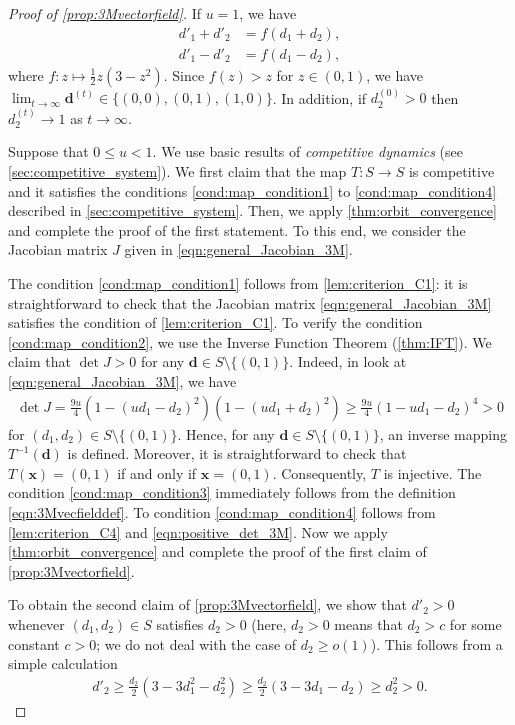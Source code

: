 \documentclass[letterpaper,11pt]{article}
\begin{document}
\begin{proof}[Proof of \cref{prop:3Mvectorfield}]
If $u=1$, we have
\begin{align*}
d'_1+d'_2 &= f(d_1+d_2), \\
d'_1-d'_2 &= f(d_1-d_2),
\end{align*}
where $f:z\mapsto \frac{1}{2}z(3-z^2)$.
Since $f(z)>z$ for $z\in(0,1)$, we have $\lim_{t\to\infty}\mathbf{d}^{(t)}\in\{(0,0),(0,1),(1,0)\}$.
In addition, if $d_2^{(0)}>0$ then $d_2^{(t)}\to 1$ as $t\to\infty$.

Suppose that $0\leq u<1$.
We use basic results of \emph{competitive dynamics} (see \cref{sec:competitive_system}).
We first claim that the map $T:S\to S$ is competitive and it satisfies the conditions \ref{cond:map_condition1} to \ref{cond:map_condition4} described in \cref{sec:competitive_system}.
Then, we apply \cref{thm:orbit_convergence} and complete the proof of the first statement.
To this end, we consider the Jacobian matrix $J$ given in \cref{eqn:general_Jacobian_3M}.

The condition \ref{cond:map_condition1} follows from \cref{lem:criterion_C1}: it is straightforward to check that the Jacobian matrix \cref{eqn:general_Jacobian_3M} satisfies the condition of \cref{lem:criterion_C1}.
To verify the condition \ref{cond:map_condition2}, we use the Inverse Function Theorem (\cref{thm:IFT}).
We claim that $\det J>0$ for any $\mathbf{d}\in S\setminus\{(0,1)\}$.
Indeed, in look at \cref{eqn:general_Jacobian_3M}, we have
\begin{align}
\det J = \frac{9u}{4}(1-(ud_1-d_2)^2)(1-(ud_1+d_2)^2) 
\geq \frac{9u}{4}(1-ud_1-d_2)^4 
>0 \label{eqn:positive_det_3M}
\end{align}
for $(d_1,d_2)\in S\setminus \{(0,1)\}$.
Hence, for any $\mathbf{d}\in S\setminus \{(0,1)\}$, an inverse mapping $T^{-1}(\mathbf{d})$ is defined.
Moreover, it is straightforward to check that $T(\mathbf{x})=(0,1)$ if and only if $\mathbf{x}=(0,1)$.
Consequently, $T$ is injective.
The condition \ref{cond:map_condition3} immediately follows from the definition \cref{eqn:3Mvecfielddef}.
To condition \ref{cond:map_condition4} follows from \cref{lem:criterion_C4} and \cref{eqn:positive_det_3M}.
Now we apply \cref{thm:orbit_convergence} and complete the proof of the first claim of \cref{prop:3Mvectorfield}.

To obtain the second claim of \cref{prop:3Mvectorfield}, we show that $d'_2>0$ whenever $(d_1,d_2)\in S$ satisfies $d_2>0$ (here, $d_2>0$ means that $d_2>c$ for some constant $c>0$; we do not deal with the case of $d_2\geq o(1)$).
This follows from a simple calculation
\begin{align*}
d'_2 \geq \frac{d_2}{2}(3-3d_1^2-d_2^2) \geq \frac{d_2}{2}(3-3d_1-d_2) 
\geq d_2^2
>0.
\end{align*}
\end{proof}
\end{document}

